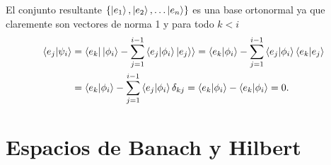 \documentclass[letterpaper]{book}
\begin{document}
El conjunto resultante \(\{\ket{e_1}, \ket{e_2},\dots \ket{e_n}\}\) es una base ortonormal ya que claremente son vectores de norma 1 y para todo \(k<i\)
\begin{align*}
\braket{e_j|\psi_i}&=\braket{e_k|\ket{\phi_i} - \sum_{j=1}^{i-1} \braket{e_j | \phi_i} \ket{e_j}}= \braket{e_k|\phi_i}-\sum_{j=1}^{i-1} \braket{e_j | \phi_i} \braket{e_k|e_j}\\
                   &=\braket{e_k|\phi_i}-\sum_{j=1}^{i-1} \braket{e_j | \phi_i} \delta_{kj}=\braket{e_k|\phi_i}-\braket{e_k | \phi_i}=0.
\end{align*}

\section{Espacios de Banach y Hilbert}
\end{document}
